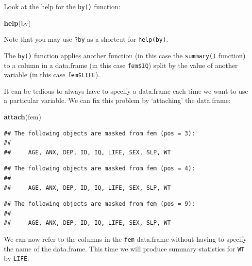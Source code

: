 \documentclass[]{book}
\newenvironment{Shaded}{\begin{snugshade}}{\end{snugshade}}
\newcommand{\KeywordTok}[1]{\textcolor[rgb]{0.13,0.29,0.53}{\textbf{#1}}}
\newcommand{\OperatorTok}[1]{\textcolor[rgb]{0.81,0.36,0.00}{\textbf{#1}}}
\newcommand{\NormalTok}[1]{#1}
\theoremstyle{definition}
\theoremstyle{definition}
\theoremstyle{definition}
\theoremstyle{remark}
\begin{document}
\begin{Shaded}
\end{Shaded}

Look at the help for the \texttt{by()} function:

\begin{Shaded}
\begin{Highlighting}[]
\KeywordTok{help}\NormalTok{(by)}
\end{Highlighting}
\end{Shaded}

Note that you may use \texttt{?by} as a shortcut for \texttt{help(by)}.

The \texttt{by()} function applies another function (in this case the
\texttt{summary()} function) to a column in a data.frame (in this case
\texttt{fem\$IQ}) split by the value of another variable (in this case
\texttt{fem\$LIFE}).

It can be tedious to always have to specify a data.frame each time we
want to use a particular variable. We can fix this problem by
`attaching' the data.frame:

\begin{Shaded}
\begin{Highlighting}[]
\KeywordTok{attach}\NormalTok{(fem)}
\end{Highlighting}
\end{Shaded}

\begin{verbatim}
## The following objects are masked from fem (pos = 3):
## 
##     AGE, ANX, DEP, ID, IQ, LIFE, SEX, SLP, WT
\end{verbatim}

\begin{verbatim}
## The following objects are masked from fem (pos = 4):
## 
##     AGE, ANX, DEP, ID, IQ, LIFE, SEX, SLP, WT
\end{verbatim}

\begin{verbatim}
## The following objects are masked from fem (pos = 9):
## 
##     AGE, ANX, DEP, ID, IQ, LIFE, SEX, SLP, WT
\end{verbatim}

We can now refer to the columns in the \texttt{fem} data.frame without
having to specify the name of the data.frame. This time we will produce
summary statistics for \texttt{WT} by \texttt{LIFE}:
\end{document}
